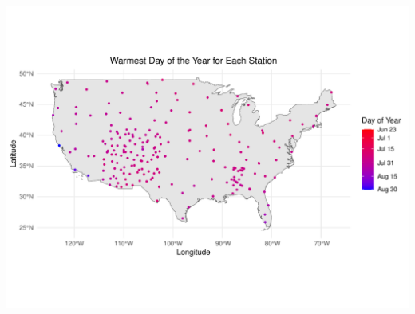 \documentclass[
]{article}
\begin{document}
\includegraphics{seesaw_files/figure-latex/unnamed-chunk-6-1.pdf}
\end{document}
